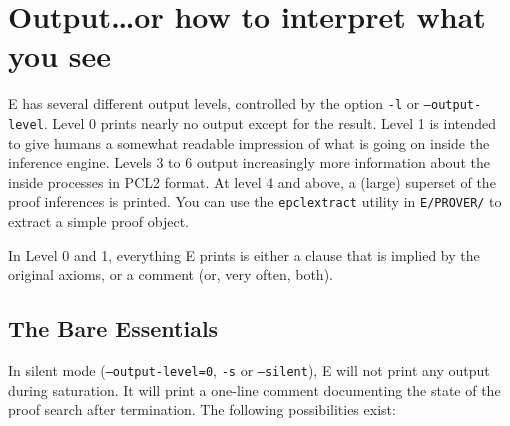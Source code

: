 \documentclass{report}
\begin{document}
\chapter{Output\ldots or how to interpret what you see}
\label{sec:output}

E has several different output levels, controlled by the option
\texttt{-l} or \texttt{--output-level}. Level 0 prints nearly no
output except for the result. Level 1 is intended to give humans a
somewhat readable impression of what is going on inside the inference
engine.  Levels 3 to 6 output increasingly more information about the
inside processes in PCL2 format. At level 4 and above, a (large)
superset of the proof inferences is printed. You can use the
\texttt{epclextract} utility in \texttt{E/PROVER/} to extract a simple
proof object.

In Level 0 and 1, everything E prints is either a clause that is
implied by the original axioms, or a comment (or, very often, both).


\section{The Bare Essentials}
\label{sec:output:essentials}

In silent mode (\texttt{--output-level=0}, \texttt{-s} or
\texttt{--silent}), E will not print any output during saturation. It
will print a one-line comment documenting the state of the proof
search after termination. The following possibilities exist:
\end{document}
